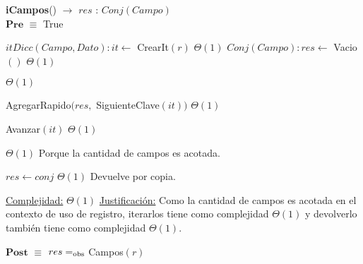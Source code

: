 \begin{algorithm}[H]{{\textbf{iCampos}()} $\to$ $res$ : $Conj(Campo)$}
	{\\ $\textbf{Pre}$ $\equiv$ True}
    	\begin{algorithmic}[1]

    		\State $itDicc(Campo, Dato): it \gets$ CrearIt$(r)$ \Comment $\Theta(1)$
			\State $Conj(Campo): res \gets$ Vacio$()$ \Comment $\Theta(1)$

			 \Comment $\Theta(1)$

				\State AgregarRapido$(res,$ SiguienteClave$(it) )$ \Comment $\Theta(1)$

				\State Avanzar$(it)$ \Comment $\Theta(1)$
			
			\EndWhile \Comment $\Theta(1)$ Porque la cantidad de campos es acotada.

			\State $res \gets conj$ \Comment $\Theta(1)$ Devuelve por copia.

			\medskip
			\Statex \underline{Complejidad:} $\Theta(1)$
			\Statex \underline{Justificación:} Como la cantidad de campos es acotada en el contexto de uso de registro, iterarlos tiene como complejidad $\Theta(1)$ y devolverlo también tiene como complejidad $\Theta(1)$.
    	\end{algorithmic}
	{$\textbf{Post}$ $\equiv$ $res =_{\mathrm{obs}}$ Campos$(r)$}
\end{algorithm}



		


